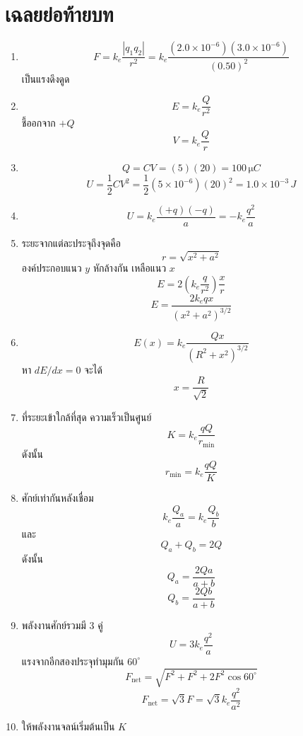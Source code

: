 \section{เฉลยย่อท้ายบท}

\begin{enumerate}
    \item
    \[
    F=k_e\frac{|q_1q_2|}{r^2}
    =k_e\frac{(2.0\times10^{-6})(3.0\times10^{-6})}{(0.50)^2}
    \]
    เป็นแรงดึงดูด

    \item
    \[
    E=k_e\frac{Q}{r^2}
    \]
    ชี้ออกจาก $+Q$
    \[
    V=k_e\frac{Q}{r}
    \]

    \item
    \[
    Q=CV=(5)(20)=100\,\si{\micro C}
    \]
    \[
    U=\frac{1}{2}CV^2=\frac{1}{2}(5\times10^{-6})(20)^2=1.0\times10^{-3}\,\si{J}
    \]

    \item
    \[
    U=k_e\frac{(+q)(-q)}{a}=-k_e\frac{q^2}{a}
    \]

    \item
    ระยะจากแต่ละประจุถึงจุดคือ
    \[
    r=\sqrt{x^2+a^2}
    \]
    องค์ประกอบแนว $y$ หักล้างกัน เหลือแนว $x$
    \[
    E=2\left(k_e\frac{q}{r^2}\right)\frac{x}{r}
    \]
    \[
    E=\frac{2k_eqx}{(x^2+a^2)^{3/2}}
    \]

    \item
    \[
    E(x)=k_e\frac{Qx}{(R^2+x^2)^{3/2}}
    \]
    หา $dE/dx=0$ จะได้
    \[
    x=\frac{R}{\sqrt{2}}
    \]

    \item
    ที่ระยะเข้าใกล้ที่สุด ความเร็วเป็นศูนย์
    \[
    K=k_e\frac{qQ}{r_{\min}}
    \]
    ดังนั้น
    \[
    r_{\min}=k_e\frac{qQ}{K}
    \]

    \item
    ศักย์เท่ากันหลังเชื่อม
    \[
    k_e\frac{Q_a}{a}=k_e\frac{Q_b}{b}
    \]
    และ
    \[
    Q_a+Q_b=2Q
    \]
    ดังนั้น
    \[
    Q_a=\frac{2Qa}{a+b}
    \]
    \[
    Q_b=\frac{2Qb}{a+b}
    \]

    \item
    พลังงานศักย์รวมมี 3 คู่
    \[
    U=3k_e\frac{q^2}{a}
    \]
    แรงจากอีกสองประจุทำมุมกัน $60^\circ$
    \[
    F_{\text{net}}=\sqrt{F^2+F^2+2F^2\cos60^\circ}
    \]
    \[
    F_{\text{net}}=\sqrt{3}F=\sqrt{3}k_e\frac{q^2}{a^2}
    \]

    \item
    ให้พลังงานจลน์เริ่มต้นเป็น $K$


\end{enumerate}
